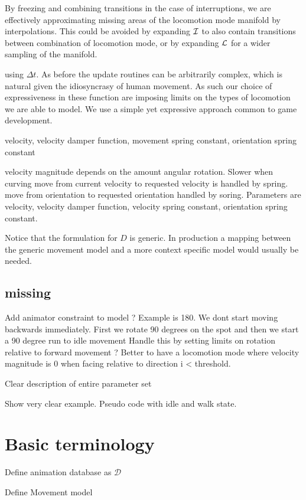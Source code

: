 By freezing and combining transitions in the case of interruptions, we are effectively approximating missing areas of the locomotion mode manifold by interpolations. This could be avoided by expanding $\mathcal{I}$ to also contain transitions between combination of locomotion mode, or by expanding $\mathcal{L}$ for a wider sampling of the manifold.

 using $\Delta{t}$. As before the update routines can be arbitrarily complex, which is natural given the idiosyncrasy of human movement. As such our choice of expressiveness in these function are imposing limits on the types of locomotion we are able to model. We use a simple yet expressive approach common to game development.   

velocity, velocity damper function, movement spring constant, orientation spring constant

velocity magnitude depends on the amount angular rotation. Slower when curving
move from current velocity to requested velocity is handled by spring.
move from orientation to requested orientation handled by soring.
Parameters are velocity, velocity damper function, velocity spring constant, orientation spring constant.


Notice that the formulation for $D$ is generic. In production a mapping between the generic movement model and a more context specific model would usually be needed. 

\subsection{missing}
Add animator constraint to model ? Example is 180. We dont start moving backwards immediately. First we rotate 90 degrees on the spot and then we start a 90 degree run to idle movement
Handle this by setting limits on rotation relative to forward movement ? Better to have a locomotion mode where velocity magnitude is 0 when facing relative to direction i < threshold.

Clear description of entire parameter set

Show very clear example. Pseudo code with idle and walk state. 



\section{Basic terminology}
Define animation database as $\mathcal{D}$

Define Movement model

